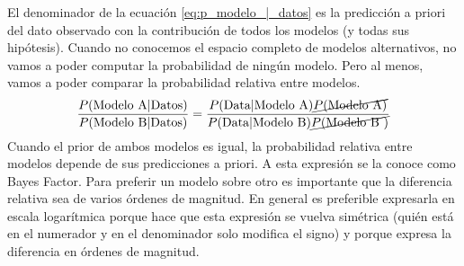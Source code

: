 \documentclass[a4paper,10pt]{book}
\theoremstyle{definition}
\begin{document}
El denominador de la ecuaci\'on \ref{eq:p_modelo_|_datos} es la predicci\'on a priori del dato observado con la contribuci\'on de todos los modelos (y todas sus hip\'otesis).
%
Cuando no conocemos el espacio completo de modelos alternativos, no vamos a poder computar la probabilidad de ning\'un modelo.
%
Pero al menos, vamos a poder comparar la probabilidad relativa entre modelos.
%
 \begin{equation}
\begin{split}
 \frac{P(\text{Modelo A}|\text{Datos})}{P(\text{Modelo B}|\text{Datos})} = \frac{P(\text{Data}|\text{Modelo A})\cancel{P(\text{Modelo A})}}{P(\text{Data}|\text{Modelo B})\cancel{P(\text{Modelo B })}}
\end{split}
\end{equation}
%
Cuando el prior de ambos modelos es igual, la probabilidad relativa entre modelos depende de sus predicciones a priori.
%
A esta expresi\'on se la conoce como Bayes Factor.
%
Para preferir un modelo sobre otro es importante que la diferencia relativa sea de varios \'ordenes de magnitud.
%
En general es preferible expresarla en escala logar\'itmica porque hace que esta expresi\'on se vuelva sim\'etrica (qui\'en est\'a en el numerador y en el denominador solo modifica el signo) y porque expresa la diferencia en \'ordenes de magnitud.

\end{document}
